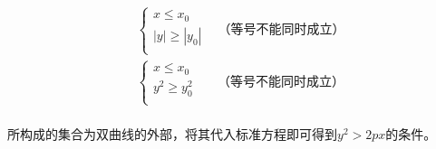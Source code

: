 \documentclass[UTF8]{ctexart}
\begin{document}
    \setcounter{equation}{0}
    \begin{align}
        &\begin{cases}
            x\leq x_0\\[1mm]
            |y|\geq|y_0|\\[1mm]
        \end{cases}~~~~\text{（等号不能同时成立）}\\[6mm]
        &\begin{cases}
            x\leq x_0\\[1mm]
            y^2\geq y_0^2\\[1mm]
        \end{cases}~~~~~~~\text{（等号不能同时成立）}
    \end{align}\\
    所构成的集合为双曲线的外部，将其代入标准方程即可得到$y^2>2px$的条件。

\newpage
\end{document}
